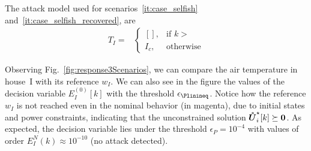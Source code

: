 \documentclass[../main.tex]{subfiles}
\begin{document}
The attack model used for scenarios~\ref{it:case_selfish} and~\ref{it:case_selfish_recovered},
are
\begin{align}
  T_{I}=&\begin{cases}
          \left[\right],&\text{if }k> \\
          I_{c},&\text{otherwise}
        \end{cases}
\end{align}

Observing Fig.~\ref{fig:response3Scenarios}, we can compare the air temperature in house~I
with its reference $w_{I}$.
We can also see in the figure the values of the decision variable ${E_{I}^{(0)}[k]}$ with the threshold $\epsilon_{\Plinineq}$.
Notice how the reference $w_{I}$ is not reached even in the nominal behavior (in magenta),
due to initial states and power constraints, indicating that the unconstrained solution $\optuncUik\succeq\0$.
As expected, the decision variable lies under the threshold ${\epsilon_{P}=10^{-4}}$ with values of order ${E_{I}^{N}(k)\approx10^{-10}}$ (no attack detected).
\end{document}
